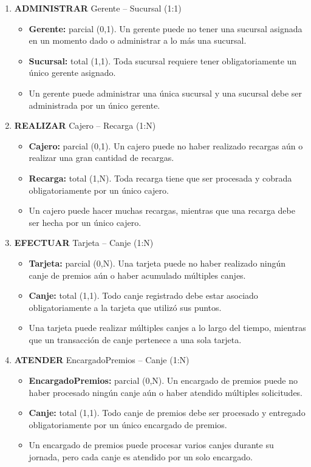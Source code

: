 \documentclass[12pt]{article}
\begin{document}
\begin{enumerate}
    \item \textbf{ADMINISTRAR} Gerente -- Sucursal (1:1)
    \begin{itemize}
        \item \textbf{Gerente:} parcial (0,1). Un gerente puede no tener una sucursal asignada en un momento dado o administrar a lo más una sucursal.
        \item \textbf{Sucursal:} total (1,1). Toda sucursal requiere tener obligatoriamente un único gerente asignado.
        \item Un gerente puede administrar una única sucursal y una sucursal debe ser administrada por un único gerente.
    \end{itemize}

    \item \textbf{REALIZAR} Cajero -- Recarga (1:N)
    \begin{itemize}
        \item \textbf{Cajero:} parcial (0,1). Un cajero puede no haber realizado recargas aún o realizar una gran cantidad de recargas.
        \item \textbf{Recarga:} total (1,N). Toda recarga tiene que ser procesada y cobrada obligatoriamente por un único cajero.
        \item Un cajero puede hacer muchas recargas, mientras que una recarga debe ser hecha por un único cajero.
    \end{itemize}

    \item \textbf{EFECTUAR} Tarjeta -- Canje (1:N)
    \begin{itemize}
        \item \textbf{Tarjeta:} parcial (0,N). Una tarjeta puede no haber realizado ningún canje de premios aún o haber acumulado múltiples canjes.
        \item \textbf{Canje:} total (1,1). Todo canje registrado debe estar asociado obligatoriamente a la tarjeta que utilizó sus puntos.
        \item Una tarjeta puede realizar múltiples canjes a lo largo del tiempo, mientras que un transacción de canje pertenece a una sola tarjeta.
    \end{itemize}

    \item \textbf{ATENDER} EncargadoPremios -- Canje (1:N)
    \begin{itemize}
        \item \textbf{EncargadoPremios:} parcial (0,N). Un encargado de premios puede no haber procesado ningún canje aún o haber atendido múltiples solicitudes.
        \item \textbf{Canje:} total (1,1). Todo canje de premios debe ser procesado y entregado obligatoriamente por un único encargado de premios.
        \item Un encargado de premios puede procesar varios canjes durante su jornada, pero cada canje es atendido por un solo encargado.
    \end{itemize}
    

\end{enumerate}
\end{document}
